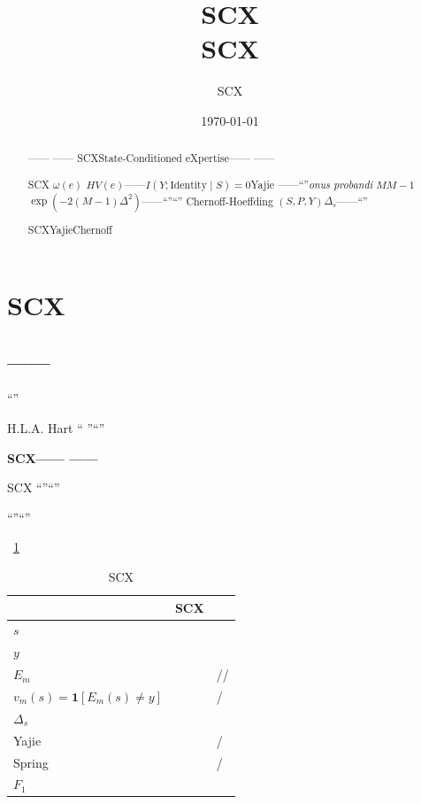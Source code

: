 \documentclass[11pt,a4paper]{article}
\title{\textbf{\LARGE SCX}\\[8pt]
       \large SCX}
\author{SCX}\\
\date{\today}
\theoremstyle{remark}
\begin{document}
\maketitle

\begin{abstract}
——
——
SCXState-Conditioned eXpertise——
——\textbf{}

SCX
\textbf{}$\omega(e)$
$H$$V(e)$——$I(Y; \text{Identity}
\mid S) = 0$\textbf{}Yajie
——``''\textit{onus probandi}
\textbf{}$M$$M-1$
$\exp(-2(M-1)\Delta^2)$——``''``''
Chernoff-Hoeffding\textbf{}
$(S, P, Y)$$\Delta_s$——``''







\textbf{}SCXYajieChernoff

\end{abstract}

\section{SCX}

\subsection{——}

``''



H.L.A. Hart\cite{hart1994concept}
\cite{rawls1971theory}
\cite{damaska1986faces}
\textbf{}``
''``''


\textbf{SCX——
——}

\textbf{}
SCX
``''``''

``''``''

~\ref{tab:mapping}

\begin{table}[htbp]
\centering
\caption{SCX}
\label{tab:mapping}
\begin{tabular}{@{}lll@{}}
\toprule
\textbf{} & \textbf{SCX} & \textbf{} \\
\midrule
 $s$ &  &  \\
 $y$ &  &  \\
 $E_m$ &  & // \\
 $v_m(s) = \mathbf{1}[E_m(s) \neq y]$ &  & / \\
 $\Delta_s$ &  &  \\
Yajie &  & / \\
Spring &  & / \\
$F_1$ &  &  \\
\bottomrule
\end{tabular}
\end{table}
\end{document}
